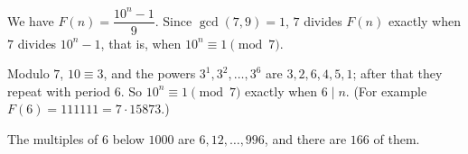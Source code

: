 We have $F(n)=\dfrac{10^n-1}{9}$. Since $\gcd(7,9)=1$, $7$ divides $F(n)$ exactly when $7$ divides $10^n-1$, that is, when $10^n\equiv1\pmod7$.

Modulo $7$, $10\equiv3$, and the powers $3^1,3^2,\dots,3^6$ are $3,2,6,4,5,1$; after that they repeat with period $6$. So $10^n\equiv1\pmod7$ exactly when $6\mid n$. (For example $F(6)=111111=7\cdot15873$.)

The multiples of $6$ below $1000$ are $6,12,\dots,996$, and there are $\boxed{166}$ of them.
